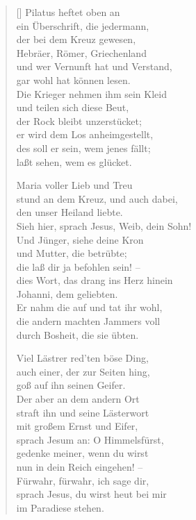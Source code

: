 \begin{multicols}{2}
\begin{verse}[\versewidth]
 Pilatus heftet oben an\\
ein Überschrift, die jedermann,\\
der bei dem Kreuz gewesen,\\
Hebräer, Römer, Griechenland\\
und wer Vernunft hat und Verstand,\\
gar wohl hat können lesen.\\
Die Krieger nehmen ihm sein Kleid\\
und teilen sich diese Beut,\\
der Rock bleibt unzerstücket;\\
er wird dem Los anheimgestellt,\\
des soll er sein, wem jenes fällt;\\
laßt sehen, wem es glücket.

 Maria voller Lieb und Treu\\
stund an dem Kreuz, und auch dabei,\\
den unser Heiland liebte.\\
Sieh hier, sprach Jesus, Weib, dein Sohn!\\
Und Jünger, siehe deine Kron\\
und Mutter, die betrübte;\\
die laß dir ja befohlen sein! –\\
dies Wort, das drang ins Herz hinein\\
Johanni, dem geliebten.\\
Er nahm die auf und tat ihr wohl,\\
die andern machten Jammers voll\\
durch Bosheit, die sie übten.

 Viel Lästrer red'ten böse Ding,\\
auch einer, der zur Seiten hing,\\
goß auf ihn seinen Geifer.\\
Der aber an dem andern Ort\\
straft ihn und seine Lästerwort\\
mit großem Ernst und Eifer,\\
sprach Jesum an: O Himmelsfürst,\\
gedenke meiner, wenn du wirst\\
nun in dein Reich eingehen! –\\
Fürwahr, fürwahr, ich sage dir,\\
sprach Jesus, du wirst heut bei mir\\
im Paradiese stehen.


\end{verse}
\end{multicols}
